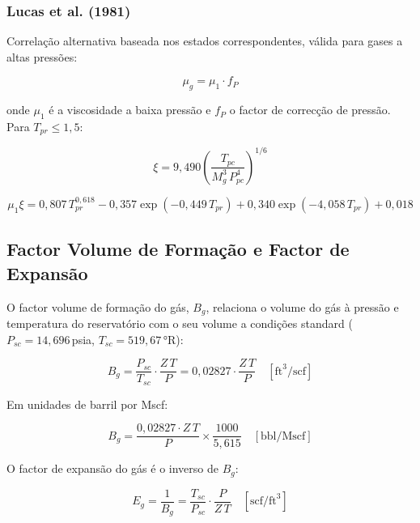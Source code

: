 \documentclass[12pt, a4paper]{article}
\begin{document}
\subsubsection{Lucas et al. (1981)}

Correlação alternativa baseada nos estados correspondentes, válida para gases
a altas pressões:

\begin{equation}
  \mu_g = \mu_1 \cdot f_P
\end{equation}

\noindent onde $\mu_1$ é a viscosidade a baixa pressão e $f_P$ o factor de
correcção de pressão. Para $T_{pr} \leq 1{,}5$:

\begin{equation}
  \xi = 9{,}490 \left(\frac{T_{pc}}{M_g^3\,P_{pc}^4}\right)^{1/6}
\end{equation}

\begin{equation}
  \mu_1 \xi = 0{,}807\,T_{pr}^{0{,}618}
              - 0{,}357\exp(-0{,}449\,T_{pr})
              + 0{,}340\exp(-4{,}058\,T_{pr})
              + 0{,}018
\end{equation}

\subsection{Factor Volume de Formação e Factor de Expansão}

O factor volume de formação do gás, $B_g$, relaciona o volume do gás à pressão
e temperatura do reservatório com o seu volume a condições standard
($P_{sc} = 14{,}696$\,psia, $T_{sc} = 519{,}67$\,°R):

\begin{equation}\label{eq:Bg}
  B_g = \frac{P_{sc}}{T_{sc}} \cdot \frac{Z\,T}{P}
      = 0{,}02827 \cdot \frac{Z\,T}{P}
        \quad \left[\text{ft}^3/\text{scf}\right]
\end{equation}

\noindent Em unidades de barril por Mscf:

\begin{equation}
  B_g = \frac{0{,}02827 \cdot Z\,T}{P} \times \frac{1000}{5{,}615}
        \quad \left[\text{bbl/Mscf}\right]
\end{equation}

O factor de expansão do gás é o inverso de $B_g$:

\begin{equation}\label{eq:Eg}
  E_g = \frac{1}{B_g} = \frac{T_{sc}}{P_{sc}} \cdot \frac{P}{Z\,T}
        \quad \left[\text{scf/ft}^3\right]
\end{equation}
\end{document}
